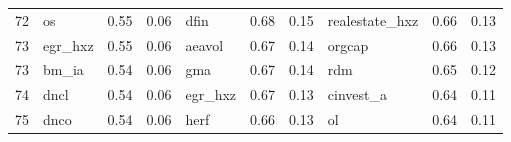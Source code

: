 \documentclass[12pt]{article}
\begin{document}
\begin{landscape}
\begin{footnotesize}
\begin{longtable}{l|lcc|lcc|lcc}
			72                    & os                          & 0.55                                                                                 & 0.06                            & dfin                        & 0.68                                                                                 & 0.15                            & realestate\_hxz             & 0.66                                                                                 & 0.13                           \\
			73                    & egr\_hxz                    & 0.55                                                                                 & 0.06                            & aeavol                      & 0.67                                                                                 & 0.14                            & orgcap                      & 0.66                                                                                 & 0.13                           \\
			73                    & bm\_ia                      & 0.54                                                                                 & 0.06                            & gma                         & 0.67                                                                                 & 0.14                            & rdm                         & 0.65                                                                                 & 0.12                           \\
			74                    & dncl                        & 0.54                                                                                 & 0.06                            & egr\_hxz                    & 0.67                                                                                 & 0.13                            & cinvest\_a                  & 0.64                                                                                 & 0.11                           \\
			75                    & dnco                        & 0.54                                                                                 & 0.06                            & herf                        & 0.66                                                                                 & 0.13                            & ol                          & 0.64                                                                                 & 0.11                           \\

\end{longtable}
\end{footnotesize}
\end{landscape}
\end{document}
